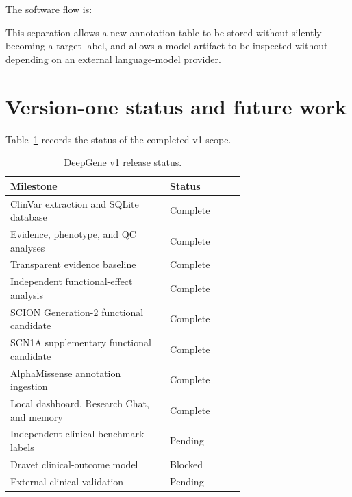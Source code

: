 \documentclass[12pt,a4paper]{article}
\begin{document}
The software flow is:
\begin{center}
\end{center}

This separation allows a new annotation table to be stored without silently
becoming a target label, and allows a model artifact to be inspected without
depending on an external language-model provider.

\section{Version-one status and future work}
Table~\ref{tab:status} records the status of the completed v1 scope.

\begin{table}[H]
\centering
\small
\caption{DeepGene v1 release status.}
\label{tab:status}
\begin{tabular}{p{0.68\linewidth}l}
\toprule
Milestone & Status\\
\midrule
ClinVar extraction and SQLite database & Complete\\
Evidence, phenotype, and QC analyses & Complete\\
Transparent evidence baseline & Complete\\
Independent functional-effect analysis & Complete\\
SCION Generation-2 functional candidate & Complete\\
SCN1A supplementary functional candidate & Complete\\
AlphaMissense annotation ingestion & Complete\\
Local dashboard, Research Chat, and memory & Complete\\
Independent clinical benchmark labels & Pending\\
Dravet clinical-outcome model & Blocked\\
External clinical validation & Pending\\
\bottomrule
\end{tabular}
\end{table}
\end{document}
